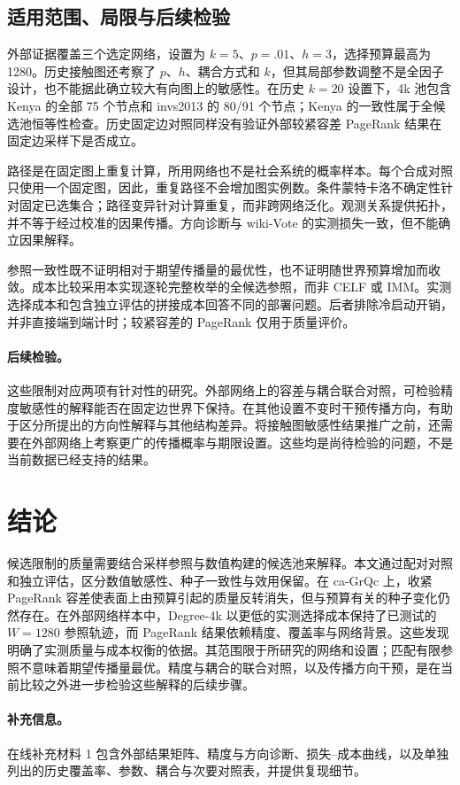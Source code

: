 \documentclass[smallextended]{svjour3}
\begin{document}
\subsection{适用范围、局限与后续检验}
外部证据覆盖三个选定网络，设置为 $k=5$、$p=.01$、$h=3$，选择预算最高为 1280。历史接触图还考察了 $p$、$h$、耦合方式和 $k$，但其局部参数调整不是全因子设计，也不能据此确立较大有向图上的敏感性。在历史 $k=20$ 设置下，4k 池包含 Kenya 的全部 75 个节点和 invs2013 的 80/91 个节点；Kenya 的一致性属于全候选池恒等性检查。历史固定边对照同样没有验证外部较紧容差 PageRank 结果在固定边采样下是否成立。

路径是在固定图上重复计算，所用网络也不是社会系统的概率样本。每个合成对照只使用一个固定图，因此，重复路径不会增加图实例数。条件蒙特卡洛不确定性针对固定已选集合；路径变异针对计算重复，而非跨网络泛化。观测关系提供拓扑，并不等于经过校准的因果传播。方向诊断与 wiki-Vote 的实测损失一致，但不能确立因果解释。

参照一致性既不证明相对于期望传播量的最优性，也不证明随世界预算增加而收敛。成本比较采用本实现逐轮完整枚举的全候选参照，而非 CELF 或 IMM。实测选择成本和包含独立评估的拼接成本回答不同的部署问题。后者排除冷启动开销，并非直接端到端计时；较紧容差的 PageRank 仅用于质量评价。

\paragraph{后续检验。}这些限制对应两项有针对性的研究。外部网络上的容差与耦合联合对照，可检验精度敏感性的解释能否在固定边世界下保持。在其他设置不变时干预传播方向，有助于区分所提出的方向性解释与其他结构差异。将接触图敏感性结果推广之前，还需要在外部网络上考察更广的传播概率与期限设置。这些均是尚待检验的问题，不是当前数据已经支持的结果。

\section{结论}
候选限制的质量需要结合采样参照与数值构建的候选池来解释。本文通过配对对照和独立评估，区分数值敏感性、种子一致性与效用保留。在 ca-GrQc 上，收紧 PageRank 容差使表面上由预算引起的质量反转消失，但与预算有关的种子变化仍然存在。在外部网络样本中，Degree-4k 以更低的实测选择成本保持了已测试的 $W=1280$ 参照轨迹，而 PageRank 结果依赖精度、覆盖率与网络背景。这些发现明确了实测质量与成本权衡的依据。其范围限于所研究的网络和设置；匹配有限参照不意味着期望传播量最优。精度与耦合的联合对照，以及传播方向干预，是在当前比较之外进一步检验这些解释的后续步骤。

\paragraph{补充信息。}在线补充材料 1 包含外部结果矩阵、精度与方向诊断、损失--成本曲线，以及单独列出的历史覆盖率、参数、耦合与次要对照表，并提供复现细节。
\end{document}
